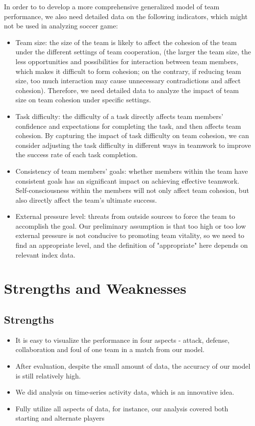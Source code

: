 \documentclass{mcmthesis}
\begin{document}
In order to to develop a more comprehensive generalized model of team performance, we also need detailed data on the following indicators, which might not be used in analyzing soccer game:
\begin{itemize}
    \item Team size: the size of the team is likely to affect the cohesion of the team under the different settings of team cooperation,  (the larger the team size, the less opportunities and possibilities for interaction between team members, which makes it difficult to form cohesion; on the contrary, if reducing team size, too much interaction may cause unnecessary contradictions and affect cohesion). Therefore, we need detailed data to analyze the impact of team size on team cohesion under specific settings.
    \item Task difficulty: the difficulty of a task directly affects team members' confidence and expectations for completing the task, and then affects team cohesion. By capturing the impact of task difficulty on team cohesion, we can consider adjusting the task difficulty in different ways in teamwork to improve the success rate of each task completion.
    \item Consistency of team members' goals: whether members within the team have consistent goals has an significant impact on achieving effective teamwork. Self-consciousness within the members will not only affect team cohesion, but also directly affect the team's ultimate success.
    \item External pressure level: threats from outside sources to force the team to accomplish the goal. Our preliminary assumption is that too high or too low external pressure is not conducive to promoting team vitality, so we need to find an appropriate level, and the definition of "appropriate" here depends on relevant index data.
\end{itemize}


\section{Strengths and Weaknesses}
    \subsection{Strengths}
        \begin{itemize}
            \item It is easy to visualize the performance in four aspects - attack, defense, collaboration and foul of one team in a match from our model.
            \item After evaluation, despite the small amount of data, the accuracy of our model is still relatively high.
            \item We did analysis on time-series activity data, which is an innovative idea.
            \item Fully utilize all aspects of data, for instance, our analysis covered both starting and alternate players
        \end{itemize}
\end{document}
